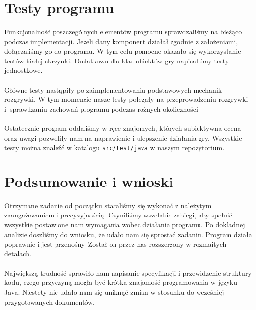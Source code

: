 \documentclass[a4paper]{article}
\newcommand{\prog}{\texttt}
\begin{document}
\section{Testy programu}
\paragraph{}Funkcjonalność poszczególnych elementów programu sprawdzaliśmy na bieżąco podczas implementacji.
Jeżeli dany komponent działał zgodnie z założeniami, dołączaliśmy go do programu.
W tym celu pomocne okazało się wykorzystanie testów białej skrzynki.
Dodatkowo dla klas obiektów gry napisaliśmy testy jednostkowe.
\paragraph{}Główne testy nastąpiły po zaimplementowaniu podstawowych mechanik rozgrywki.
W tym momencie nasze testy polegały na przeprowadzeniu rozgrywki i~sprawdzaniu zachowań programu podczas różnych okoliczności.
\paragraph{}Ostatecznie program oddaliśmy w ręce znajomych, których subiektywna ocena oraz uwagi pozwoliły nam na naprawienie i ulepszenie działania gry.
Wszystkie testy można znaleźć w katalogu \prog{src/test/java} w naszym repozytorium.

\section{Podsumowanie i wnioski}
\paragraph{}Otrzymane zadanie od początku staraliśmy się wykonać z należytym zaangażowaniem i precyzyjnością. Czyniliśmy wszelakie zabiegi, aby spełnić wszystkie postawione nam wymagania wobec działania programu. Po dokładnej analizie doszliśmy do wniosku, że udało nam się sprostać zadaniu. Program działa poprawnie i jest przenośny. Został on przez nas rozszerzony w rozmaitych detalach.
\paragraph{}Największą trudność sprawiło nam napisanie specyfikacji i przewidzenie struktury kodu, czego przyczyną mogła być krótka znajomość programowania w języku Java. Niestety nie udało nam się uniknąć zmian w stosunku do wcześniej przygotowanych dokumentów.
\end{document}
